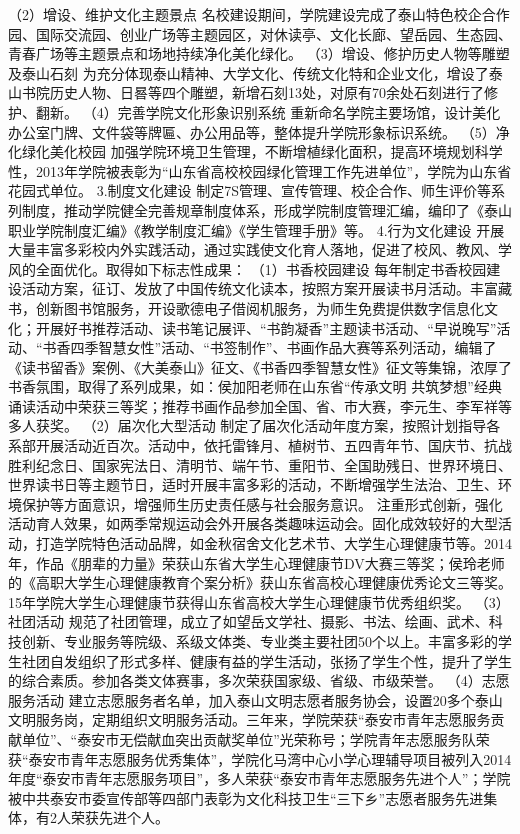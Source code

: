 （2）增设、维护文化主题景点
名校建设期间，学院建设完成了泰山特色校企合作园、国际交流园、创业广场等主题园区，对休读亭、文化长廊、望岳园、生态园、青春广场等主题景点和场地持续净化美化绿化。
（3）增设、修护历史人物等雕塑及泰山石刻
为充分体现泰山精神、大学文化、传统文化特和企业文化，增设了泰山书院历史人物、日晷等四个雕塑，新增石刻13处，对原有70余处石刻进行了修护、翻新。
（4）完善学院文化形象识别系统
重新命名学院主要场馆，设计美化办公室门牌、文件袋等牌匾、办公用品等，整体提升学院形象标识系统。
（5）净化绿化美化校园
加强学院环境卫生管理，不断增植绿化面积，提高环境规划科学性，2013年学院被表彰为“山东省高校校园绿化管理工作先进单位”，学院为山东省花园式单位。
3.制度文化建设
制定7S管理、宣传管理、校企合作、师生评价等系列制度，推动学院健全完善规章制度体系，形成学院制度管理汇编，编印了《泰山职业学院制度汇编》《教学制度汇编》《学生管理手册》等。
4.行为文化建设
开展大量丰富多彩校内外实践活动，通过实践使文化育人落地，促进了校风、教风、学风的全面优化。取得如下标志性成果：
（1）书香校园建设
每年制定书香校园建设活动方案，征订、发放了中国传统文化读本，按照方案开展读书月活动。丰富藏书，创新图书馆服务，开设歌德电子借阅机服务，为师生免费提供数字信息化文化；开展好书推荐活动、读书笔记展评、“书韵凝香”主题读书活动、“早说晚写”活动、“书香四季智慧女性”活动、“书签制作”、书画作品大赛等系列活动，编辑了《读书留香》案例、《大美泰山》征文、《书香四季智慧女性》征文等集锦，浓厚了书香氛围，取得了系列成果，如：侯加阳老师在山东省“传承文明 共筑梦想”经典诵读活动中荣获三等奖；推荐书画作品参加全国、省、市大赛，李元生、李军祥等多人获奖。
（2）届次化大型活动
制定了届次化活动年度方案，按照计划指导各系部开展活动近百次。活动中，依托雷锋月、植树节、五四青年节、国庆节、抗战胜利纪念日、国家宪法日、清明节、端午节、重阳节、全国助残日、世界环境日、世界读书日等主题节日，适时开展丰富多彩的活动，不断增强学生法治、卫生、环境保护等方面意识，增强师生历史责任感与社会服务意识。
注重形式创新，强化活动育人效果，如两季常规运动会外开展各类趣味运动会。固化成效较好的大型活动，打造学院特色活动品牌，如金秋宿舍文化艺术节、大学生心理健康节等。2014年，作品《朋辈的力量》荣获山东省大学生心理健康节DV大赛三等奖；侯玲老师的《高职大学生心理健康教育个案分析》获山东省高校心理健康优秀论文三等奖。15年学院大学生心理健康节获得山东省高校大学生心理健康节优秀组织奖。
（3）社团活动
规范了社团管理，成立了如望岳文学社、摄影、书法、绘画、武术、科技创新、专业服务等院级、系级文体类、专业类主要社团50个以上。丰富多彩的学生社团自发组织了形式多样、健康有益的学生活动，张扬了学生个性，提升了学生的综合素质。参加各类文体赛事，多次荣获国家级、省级、市级荣誉。 
（4）志愿服务活动
建立志愿服务者名单，加入泰山文明志愿者服务协会，设置20多个泰山文明服务岗，定期组织文明服务活动。三年来，学院荣获“泰安市青年志愿服务贡献单位”、“泰安市无偿献血突出贡献奖单位”光荣称号；学院青年志愿服务队荣获“泰安市青年志愿服务优秀集体”，学院化马湾中心小学心理辅导项目被列入2014年度“泰安市青年志愿服务项目”，多人荣获“泰安市青年志愿服务先进个人”；学院被中共泰安市委宣传部等四部门表彰为文化科技卫生“三下乡”志愿者服务先进集体，有2人荣获先进个人。
